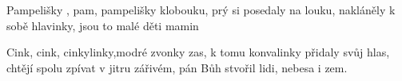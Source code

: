 \begin{TEXT}{Pampelišky}
\SLOKA {}, pam, pampelišky  klobouku,
prý si posedaly  na louku,
nakláněly k sobě  hlavinky,
jsou to malé děti  mamin

\SLOKA Cink, cink, cinkylinky,modré zvonky zas,
k tomu konvalinky přidaly svůj hlas,
chtějí spolu zpívat v jitru zářivém,
pán Bůh stvořil lidi, nebesa i zem.
\end{TEXT}